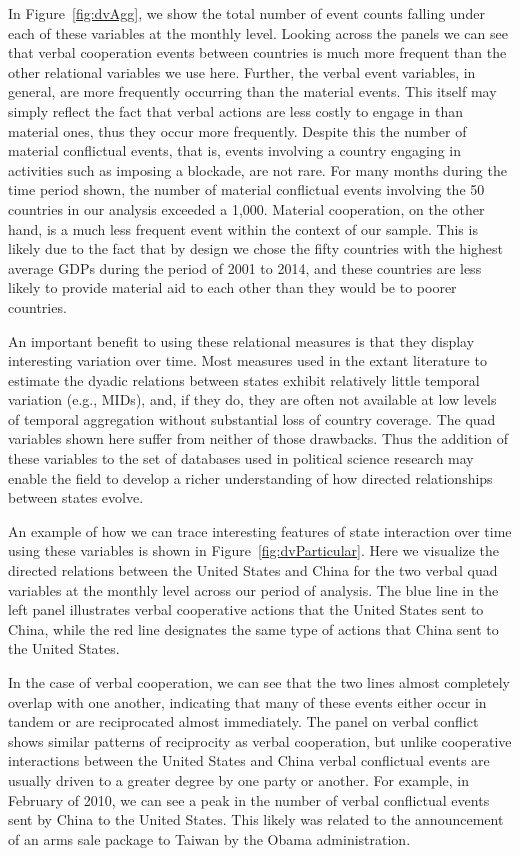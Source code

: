 \documentclass[3p,times,twocolumn,authoryear,12pt]{elsarticle}
\begin{document}
In Figure~\ref{fig:dvAgg}, we show the total number of event counts falling under each of these variables at the monthly level. Looking across the panels we can see that verbal cooperation events between countries is much more frequent than the other relational variables we use here. Further, the verbal event variables, in general, are more frequently occurring than the material events. This itself may simply reflect the fact that verbal actions are less costly to engage in than material ones, thus they occur more frequently. Despite this the number of material conflictual events, that is, events involving a country engaging in activities such as imposing a blockade, are not rare. For many months during the time period shown, the number of material conflictual events involving the 50 countries in our analysis exceeded a 1,000. Material cooperation, on the other hand, is a much less frequent event within the context of our sample. This is likely due to the fact that by design we chose the fifty countries with the highest average GDPs during the period of 2001 to 2014, and these countries are less likely to provide material aid to each other than they would be to poorer countries. 

An important benefit to using these relational measures is that they display interesting variation over time. Most measures used in the extant literature to estimate the dyadic relations between states exhibit relatively little temporal variation (e.g., MIDs), and, if they do, they are often not available at low levels of temporal aggregation without substantial loss of country coverage. The quad variables shown here suffer from neither of those drawbacks. Thus the addition of these variables to the set of databases used in political science research may enable the field to develop a richer understanding of how directed relationships between states evolve. 

An example of how we can trace interesting features of state interaction over time using these variables is shown in Figure~\ref{fig:dvParticular}. Here we visualize the directed relations between the United States and China for the two verbal quad variables at the monthly level across our period of analysis. The blue line in the left panel illustrates verbal cooperative actions that the United States sent to China, while the red line designates the same type of actions that China sent to the United States. 

In the case of verbal cooperation, we can see that the two lines almost completely overlap with one another, indicating that many of these events either occur in tandem or are reciprocated almost immediately. The panel on verbal conflict shows similar patterns of reciprocity as verbal cooperation, but unlike cooperative interactions between the United States and China verbal conflictual events are usually driven to a greater degree by one party or another. For example, in February of 2010, we can see a peak in the number of verbal conflictual events sent by China to the United States. This likely was related to the announcement of an arms sale package to Taiwan by the Obama administration. 
\end{document}

